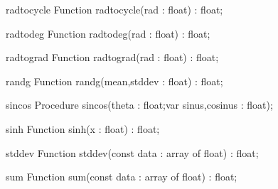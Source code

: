 \begin{function}{radtocycle}
\Declaration
Function radtocycle(rad : float) : float;
\Description

\Errors
\SeeAlso
\end{function}

\FPCexample{}


\begin{function}{radtodeg}
\Declaration
Function radtodeg(rad : float) : float;
\Description

\Errors
\SeeAlso
\end{function}

\FPCexample{}


\begin{function}{radtograd}
\Declaration
Function radtograd(rad : float) : float;
\Description

\Errors
\SeeAlso
\end{function}

\FPCexample{}


\begin{function}{randg}
\Declaration
Function randg(mean,stddev : float) : float;
\Description

\Errors
\SeeAlso
\end{function}

\FPCexample{}


\begin{procedure}{sincos}
\Declaration
Procedure sincos(theta : float;var sinus,cosinus : float);
\Description

\Errors
\SeeAlso
\end{procedure}

\FPCexample{}


\begin{function}{sinh}
\Declaration
Function sinh(x : float) : float;
\Description

\Errors
\SeeAlso
\end{function}

\FPCexample{}


\begin{function}{stddev}
\Declaration
Function stddev(const data : array of float) : float;
\Description

\Errors
\SeeAlso
\end{function}

\FPCexample{}


\begin{function}{sum}
\Declaration
Function sum(const data : array of float) : float;
\Description

\Errors
\SeeAlso
\end{function}

